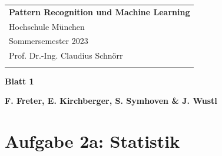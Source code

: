 \documentclass[a4paper,12pt]{article}
\begin{document}
\thispagestyle{empty} 

\begin{tabular}{p{15.5cm}} 
{\large \bf Pattern Recognition und Machine Learning} \\
Hochschule München \\ Sommersemester 2023  \\ Prof. Dr.-Ing. Claudius Schnörr \\
\hline 
\\
\end{tabular} 

\vspace*{0.3cm} 

\begin{center} 
	{\Large \bf Blatt 1} 
	\vspace{2mm}
	

	{\bf F. Freter, E. Kirchberger, S. Symhoven \& J. Wustl} 
		
\end{center}  

\vspace{0.4cm}

\section*{Aufgabe 2a: Statistik}
\end{document}
